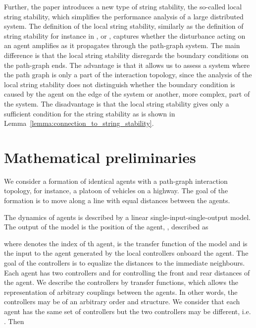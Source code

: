 \documentclass[10pt,twocolumn,twoside]{IEEEtran}
\theoremstyle{definition}
\newcommand{\revA}{Black}
\begin{document}
{\color{\revA} Further, the paper introduces a new type of string stability, the so-called local string stability, which simplifies the performance analysis of a large distributed system. The definition of the local string stability, similarly as the definition of string stability for instance in \cite{Ploeg2014}, \cite{Seiler2004a} or \cite{Eyre1998a}, captures whether the disturbance acting on an agent amplifies as it propagates through the path-graph system. The main difference is that the local string stability disregards the boundary conditions on the path-graph ends. The advantage is that it allows us to assess a system where the path graph is only a part of the interaction topology, since the analysis of the local string stability does not distinguish whether the boundary condition is caused by the agent on the edge of the system or another, more complex, part of the system. The disadvantage is that the local string stability gives only a sufficient condition for the string stability as is shown in Lemma~\ref{lemma:connection_to_string_stability}.

}










\section{Mathematical preliminaries}

We consider a formation of identical agents with a path-graph interaction topology, for instance, a platoon of vehicles on a highway. The goal of the formation is to move along a line with equal distances between the agents.

The dynamics of agents is described by a linear single-input-single-output model. The output of the model is the position of the agent, , described as

where  denotes the index of th agent,  is the transfer function of the model and  is the input to the agent generated by the local controllers onboard the agent. The goal of the controllers is to equalize the distances to the immediate neighbours. Each agent has two controllers  and  for controlling the front and rear distances of the agent. We describe the controllers by transfer functions, which allows the representation of arbitrary couplings between the agents. In other words, the controllers may be of an arbitrary order and structure. We consider that each agent has the same set of controllers but the two controllers may be different, i.e. . Then
\end{document}
